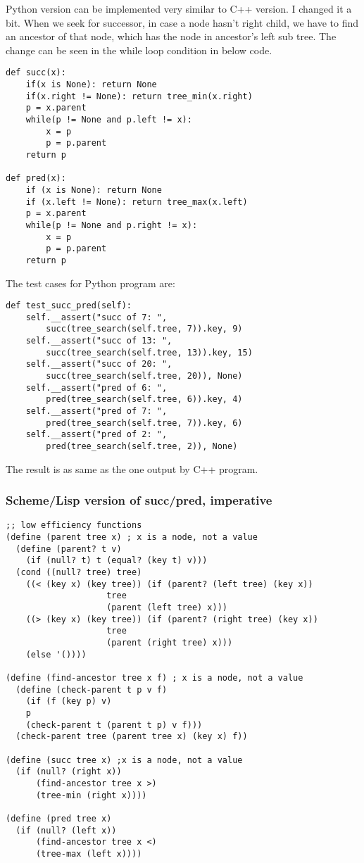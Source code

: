 \documentclass{article}
\begin{document}
Python version can be implemented very similar to C++ version. I changed it
a bit. When we seek for successor, in case a node hasn't right child, we have to find an ancestor of that
node, which has the node in ancestor's left sub tree. The change can be seen
in the while loop condition in below code.

\lstset{language=Python}
\begin{lstlisting}
def succ(x):
    if(x is None): return None
    if(x.right != None): return tree_min(x.right)
    p = x.parent
    while(p != None and p.left != x):
        x = p
        p = p.parent
    return p

def pred(x):
    if (x is None): return None
    if (x.left != None): return tree_max(x.left)
    p = x.parent
    while(p != None and p.right != x):
        x = p
        p = p.parent
    return p
\end{lstlisting}

The test cases for Python program are:
\begin{lstlisting}
def test_succ_pred(self):
    self.__assert("succ of 7: ", 
        succ(tree_search(self.tree, 7)).key, 9)
    self.__assert("succ of 13: ", 
        succ(tree_search(self.tree, 13)).key, 15)
    self.__assert("succ of 20: ", 
        succ(tree_search(self.tree, 20)), None)
    self.__assert("pred of 6: ", 
        pred(tree_search(self.tree, 6)).key, 4)
    self.__assert("pred of 7: ", 
        pred(tree_search(self.tree, 7)).key, 6)
    self.__assert("pred of 2: ", 
        pred(tree_search(self.tree, 2)), None)
\end{lstlisting}

The result is as same as the one output by C++ program.

\subsubsection*{Scheme/Lisp version of succ/pred, imperative}

\lstset{language=lisp}
\begin{lstlisting}
;; low efficiency functions
(define (parent tree x) ; x is a node, not a value
  (define (parent? t v)
    (if (null? t) t (equal? (key t) v)))
  (cond ((null? tree) tree)
	((< (key x) (key tree)) (if (parent? (left tree) (key x))
				    tree
				    (parent (left tree) x)))
	((> (key x) (key tree)) (if (parent? (right tree) (key x))
				    tree
				    (parent (right tree) x)))
	(else '())))

(define (find-ancestor tree x f) ; x is a node, not a value
  (define (check-parent t p v f)
    (if (f (key p) v)
	p
	(check-parent t (parent t p) v f)))
  (check-parent tree (parent tree x) (key x) f))

(define (succ tree x) ;x is a node, not a value
  (if (null? (right x))
      (find-ancestor tree x >)
      (tree-min (right x))))

(define (pred tree x)
  (if (null? (left x))
      (find-ancestor tree x <)
      (tree-max (left x))))
\end{lstlisting}
\end{document}
